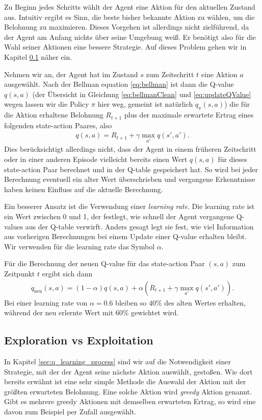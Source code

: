 Zu Beginn jedes Schritts wählt der Agent eine Aktion für den aktuellen Zustand aus. Intuitiv ergibt es Sinn, die beste bisher bekannte Aktion zu wählen, um die Belohnung zu maximieren. Dieses Vorgehen ist allerdings nicht zielführend, da der Agent am Anfang nichts über seine Umgebung weiß. Er benötigt also für die Wahl seiner Aktionen eine bessere Strategie. Auf dieses Problem gehen wir in Kapitel \ref{sec:exploration_exploitation} näher ein.

Nehmen wir an, der Agent hat im Zustand $ s $ zum Zeitschritt $ t $ eine Aktion $ a $ ausgewählt. Nach der Bellman equation \ref{eq:bellman} ist dann die Q-value $ q(s, a) $ (der Übersicht in Gleichung \ref{eq:bellmanClean} und \ref{eq:updateQValue} wegen lassen wir die Policy $ \pi $ hier weg, gemeint ist natürlich $ q_\pi(s, a) $) die für die Aktion erhaltene Belohnung $ R_{t + 1} $ plus der maximale erwartete Ertrag eines folgenden state-action Paares, also
\begin{align}
    q(s, a) = R_{t + 1} + \gamma \max_{a'} q(s', a'). \label{eq:bellmanClean}
\end{align}
Dies berücksichtigt allerdings nicht, dass der Agent in einem früheren Zeitschritt oder in einer anderen Episode vielleicht bereits einen Wert $ q(s, a) $ für dieses state-action Paar berechnet und in der Q-table gespeichert hat. So wird bei jeder Berechnung eventuell ein alter Wert überschrieben und vergangene Erkenntnisse haben keinen Einfluss auf die aktuelle Berechnung.

Ein besserer Ansatz ist die Verwendung einer \textit{learning rate}. Die learning rate ist ein Wert zwischen 0 und 1, der festlegt, wie schnell der Agent vergangene Q-values aus der Q-table verwirft. Anders gesagt legt sie fest, wie viel Information aus vorherigen Berechnungen bei einem Update einer Q-value erhalten bleibt. Wir verwenden für die learning rate das Symbol $ \alpha $.

Für die Berechnung der neuen Q-value für das state-action Paar $ (s, a) $ zum Zeitpunkt $ t $ ergibt sich dann
\begin{align}
    q_\text{neu}(s, a) = (1 - \alpha) q(s, a) + \alpha \left(R_{t + 1} + \gamma \max_{a'} q(s', a') \right). \label{eq:updateQValue}
\end{align}
Bei einer learning rate von $ \alpha = 0.6 $ bleiben so $ 40\% $ des alten Wertes erhalten, während der neu erlernte Wert mit $ 60\% $ gewichtet wird.

\subsection{Exploration vs Exploitation} \label{sec:exploration_exploitation}
In Kapitel \ref{sec:q_learning_process} sind wir auf die Notwendigkeit einer Strategie, mit der der Agent seine nächste Aktion auswählt, gestoßen. Wie dort bereits erwähnt ist eine sehr simple Methode die Auswahl der Aktion mit der größten erwarteten Belohnung. Eine solche Aktion wird \textit{greedy} Aktion genannt. Gibt es mehrere greedy Aktionen mit demselben erwarteten Ertrag, so wird eine davon zum Beispiel per Zufall ausgewählt.

